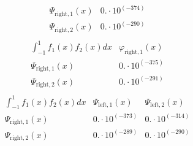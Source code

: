 \documentclass{article}
\begin{document}
\begin{landscape}
$$\begin{array}{l|l}
 \Psi_{\text{right},1}(x) & 0.\cdot 10^{(-374)} \\ 
\Psi_{\text{right},2}(x) & 0.\cdot 10^{(-290)} \\ 
\end{array} $$ 
$$ \begin{array}{l|l}
\int_{-1}^1 f_1(x)f_2(x) dx& \varphi_{\text{right},1}(x) \\ \hline 
 \Psi_{\text{right},1}(x) & 0.\cdot 10^{(-375)} \\ 
\Psi_{\text{right},2}(x) & 0.\cdot 10^{(-291)} \\ 
\end{array} $$ 
$$ \begin{array}{l|ll}
\int_{-1}^1 f_1(x)f_2(x) dx& \Psi_{\text{left},1}(x)& \Psi_{\text{left},2}(x) \\ \hline 
 \Psi_{\text{right},1}(x) & 0.\cdot 10^{(-373)} & 0.\cdot 10^{(-314)} \\ 
\Psi_{\text{right},2}(x) & 0.\cdot 10^{(-289)} & 0.\cdot 10^{(-290)} \\ 
\end{array} $$ 
\end{landscape}
\end{document}
